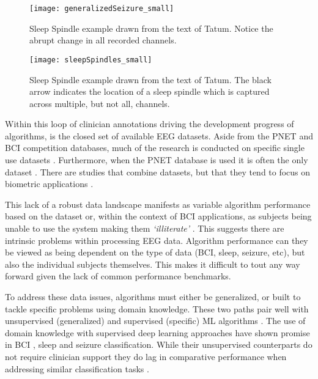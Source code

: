 \begin{figure}
\centering
\texttt{[image: generalizedSeizure\_small]}
\caption[Sleep Spindle example]{Sleep Spindle example drawn from the text of Tatum\cite{Tatum2014}. Notice the abrupt change in all recorded channels.}
\label{fig:generalized_seizure}
\end{figure}

\begin{figure}
\centering
\texttt{[image: sleepSpindles\_small]}
\caption[Sleep Spindle example]{Sleep Spindle example drawn from the text of Tatum\cite{Tatum2014}. The black arrow indicates the location of a sleep spindle which is captured across multiple, but not all, channels.}
\label{fig:sleep_spindle}
\end{figure}

Within this loop of clinician annotations driving the development progress of algorithms, is the closed set of available \ac{EEG} datasets. Aside from the \ac{PNET} \cite{Goldberger2000} and \ac{BCI} competition \cite{Blankertz2006a} databases, much of the research is conducted on specific single use datasets \cite{Wulsin2011,Subasi2010,Radha2014}. Furthermore, when the \ac{PNET} database is used it is often the only dataset \cite{Yang2016,Marcel2007a,Fraschini2015,Rodrigues2016}. There are studies that combine datasets, but that they tend to focus on biometric applications \cite{Delpozo-Banos2015}.

This lack of a robust data landscape manifests as variable algorithm performance based on the dataset\cite{Lawhern2016,Lotte2007b} or, within the context of \ac{BCI} applications, as subjects being unable to use the system making them \textit{`illiterate'} \cite{Vidaurre2010a,Spezialetti2018}. This suggests there are intrinsic problems within processing \ac{EEG} data. Algorithm performance can they be viewed as being dependent on the type of data (\ac{BCI}, sleep, seizure, etc), but also the individual subjects themselves. This makes it difficult to tout any way forward given the lack of common performance benchmarks.

To address these data issues, algorithms must either be generalized, or built to tackle specific problems using domain knowledge. These two paths pair well with unsupervised (generalized) and supervised (specific) \ac{ML} algorithms \cite{Makeig2012,Martinez-del-Rincon2017,Blanco2010,Lotte2018}. The use of domain knowledge with supervised deep learning approaches have shown promise in \ac{BCI} \cite{Tabar2017}, sleep \cite{Aboalayon2014} and seizure \cite{Wulsin2011,Chu2017} classification. While their unsupervised counterparts do not require clinician support they do lag in comparative performance when addressing similar classification tasks \cite{Vidaurre2011,Lu2009a,Kasabov2013,Lotte2018}.

